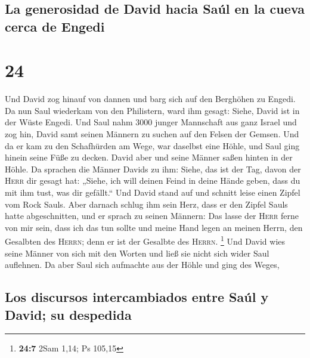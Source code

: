 \hypertarget{la-generosidad-de-david-hacia-sauxfal-en-la-cueva-cerca-de-engedi}{%
\subsection{La generosidad de David hacia Saúl en la cueva cerca de
Engedi}\label{la-generosidad-de-david-hacia-sauxfal-en-la-cueva-cerca-de-engedi}}

\hypertarget{section-23}{%
\section{24}\label{section-23}}

 Und David zog hinauf von dannen und barg sich auf den
Berghöhen zu Engedi.  Da nun Saul wiederkam von den
Philistern, ward ihm gesagt: Siehe, David ist in der Wüste Engedi.
 Und Saul nahm 3000 junger Mannschaft aus ganz Israel und
zog hin, David samt seinen Männern zu suchen auf den Felsen der Gemsen.
 Und da er kam zu den Schafhürden am Wege, war daselbst
eine Höhle, und Saul ging hinein seine Füße zu decken. David aber und
seine Männer saßen hinten in der Höhle.  Da sprachen die
Männer Davids zu ihm: Siehe, das ist der Tag, davon der \textsc{Herr}
dir gesagt hat: „Siehe, ich will deinen Feind in deine Hände geben, dass
du mit ihm tust, was dir gefällt.`` Und David stand auf und schnitt
leise einen Zipfel vom Rock Sauls.  Aber darnach schlug
ihm sein Herz, dass er den Zipfel Sauls hatte abgeschnitten,
 und er sprach zu seinen Männern: Das lasse der
\textsc{Herr} ferne von mir sein, dass ich das tun sollte und meine Hand
legen an meinen Herrn, den Gesalbten des \textsc{Herrn}; denn er ist der
Gesalbte des \textsc{Herrn}. \footnote{\textbf{24:7} 2Sam 1,14; Ps
  105,15}  Und David wies seine Männer von sich mit den
Worten und ließ sie nicht sich wider Saul auflehnen. Da aber Saul sich
aufmachte aus der Höhle und ging des Weges,

\hypertarget{los-discursos-intercambiados-entre-sauxfal-y-david-su-despedida}{%
\subsection{Los discursos intercambiados entre Saúl y David; su
despedida}\label{los-discursos-intercambiados-entre-sauxfal-y-david-su-despedida}}

